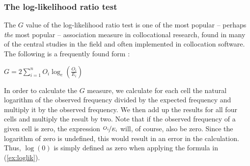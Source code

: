 \subsubsection{The log\hyp{}likelihood ratio test}
\label{sec:amloglikelihood}

The $G$  value of the log\hyp{}likelihood ratio test is one of the most popular -- perhaps \textit{the} most popular -- association  measure  in collocational  research, found in many of the central studies in the field and often implemented in collocation software. The following is a frequently found form \citep[134]{read_goodness--fit_1988}:

\begin{exe}
\ex $\displaystyle{G = 2 \sum_{i=1}^{n} O_i \log_e \left(\frac{O_i}{E_i} \right)}$
\label{ex:loglik}
\end{exe}

In order to calculate the $G$  measure, we calculate for each cell the natural logarithm  of the observed frequency  divided by the expected  frequency and multiply it by the observed frequency. We then add up the results for all four cells and multiply the result by two. Note that if the observed frequency of a given cell is zero, the expression $\nicefrac{O_i}{E_i}$ will, of course, also be zero. Since the logarithm  of zero is undefined, this would result in an error in the calculation. Thus, $\log(0)$ is simply defined as zero when applying the formula in (\ref{ex:loglik}).


